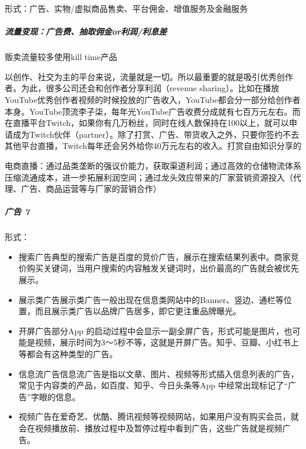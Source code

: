 \documentclass[letterpaper,11pt,english]{sphinxmanual}
\begin{document}
形式：广告、实物/虚拟商品售卖、平台佣金、增值服务及金融服务


\subparagraph{流量变现：广告费、抽取佣金or利润/利息差}
\label{\detokenize{chapter_introduction/money:or}}
贩卖流量较多使用kill time产品

以创作、社交为主的平台来说，流量就是一切。所以最重要的就是吸引优秀创作者。为此，很多公司还会和创作者分享利润（revenue
sharing）。比如在播放YouTube优秀创作者视频的时候投放的广告收入，YouTube都会分一部分给创作者本身。YouTube顶流李子柒，每年光YouTube广告收费分成就有七百万元左右。而在直播平台Twitch，如果你有几万粉丝，同时在线人数保持在100以上，就可以申请成为Twitch伙伴（partner）。除了打赏、广告、带货收入之外，只要你签约不去其他平台直播，Twitch每年还会另外给你40万元左右的收入。打赏自由知识分享的

电商直播：通过品类垄断的强议价能力，获取渠道利润；通过高效的仓储物流体系压缩流通成本，进一步拓展利润空间；通过龙头效应带来的厂家营销资源投入（代理、广告、商品运营等与厂家的营销合作）


\subparagraph{广告 7\sphinxfootnotemark[47]}
\label{\detokenize{chapter_introduction/money:id9}}%
\begin{footnotetext}[47]\sphinxAtStartFootnote
{}
%
\end{footnotetext}\ignorespaces 
形式：
\begin{itemize}
\item {} 
搜索广告典型的搜索广告是百度的竞价广告，展示在搜索结果列表中。商家竞价购买关键词，当用户搜索的内容触发关键词时，出价最高的广告就会被优先展示。

\item {} 
展示类广告展示类广告一般出现在信息类网站中的Banner、竖边、通栏等位置，而且展示类广告以品牌广告居多，即它更注重品牌曝光。

\item {} 
开屏广告部分App
的启动过程中会显示一副全屏广告，形式可能是图片，也可能是视频，展示时间为3～5秒不等，这就是开屏广告。知乎、豆瓣、小红书上等都会有这种类型的广告。

\item {} 
信息流广告信息流广告是指以文章、图片、视频等形式插入信息列表的广告，常见于内容类的产品，如百度、知乎、今日头条等App
中经常出现标记了“广告”字眼的信息。

\item {} 
视频广告在爱奇艺、优酷、腾讯视频等视频网站，如果用户没有购买会员，就会在视频播放前、播放过程中及暂停过程中看到广告，这些广告就是视频广告。

\end{itemize}
\end{document}
